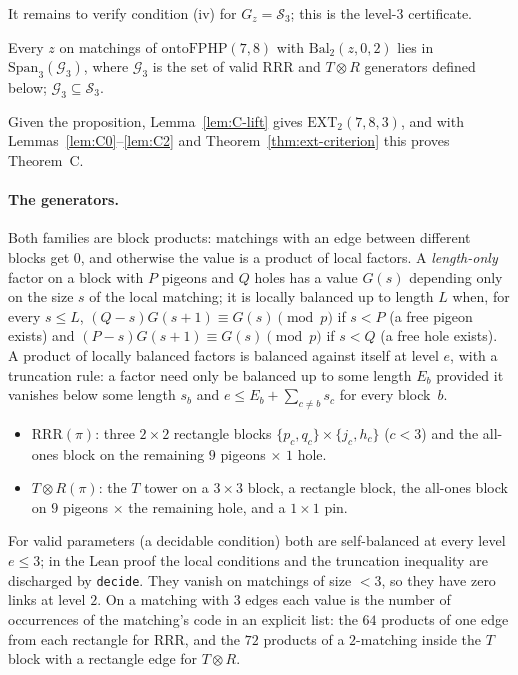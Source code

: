 It remains to verify condition (iv) for $G_z=\mathcal S_3$; this is the level-$3$
certificate.

\begin{proposition}\label{prop:C-z3}
Every $z$ on matchings of $\mathrm{ontoFPHP}(7,8)$ with $\mathrm{Bal}_2(z,0,2)$ lies
in $\mathrm{Span}_3(\mathcal G_3)$, where $\mathcal G_3$ is the set of valid RRR and
$T\otimes R$ generators defined below; $\mathcal G_3\subseteq\mathcal S_3$.
\end{proposition}

Given the proposition, Lemma~\ref{lem:C-lift} gives
$\mathrm{EXT}_2(7,8,3)$, and with
Lemmas~\ref{lem:C0}--\ref{lem:C2} and Theorem~\ref{thm:ext-criterion} this proves
Theorem~C.

\paragraph{The generators.}
Both families are block products: matchings with an edge between different blocks
get $0$, and otherwise the value is a product of local factors.  A \emph{length-only}
factor on a block with $P$ pigeons and $Q$ holes has a value $G(s)$ depending only
on the size $s$ of the local matching; it is locally balanced up to length $L$ when, for
every $s\le L$, $(Q-s)G(s+1)\equiv G(s)\pmod p$ if $s<P$ (a free pigeon exists) and
$(P-s)G(s+1)\equiv G(s)\pmod p$ if $s<Q$ (a free hole exists).  A
product of locally balanced factors is balanced against itself at level $e$, with a
truncation rule: a factor need only be balanced up to some length $E_b$ provided it
vanishes below some length $s_b$ and $e\le E_b+\sum_{c\ne b}s_c$ for every
block~$b$.
\begin{itemize}
\item $\mathrm{RRR}(\pi)$: three $2\times2$ rectangle blocks
$\{p_c,q_c\}\times\{j_c,h_c\}$ ($c<3$) and the all-ones block on the remaining $9$
pigeons $\times$ $1$ hole.
\item $T\otimes R(\pi)$: the $T$ tower on a $3\times3$ block, a rectangle block, the
all-ones block on $9$ pigeons $\times$ the remaining hole, and a $1\times1$ pin.
\end{itemize}
For valid parameters (a decidable condition) both are self-balanced at every level
$e\le3$; in the Lean proof the local conditions and the truncation inequality are
discharged by \texttt{decide}.  They vanish on
matchings of size $<3$, so they have zero links at level $2$.
On a matching with $3$ edges each value is the number of occurrences of the
matching's code in an explicit list: the $64$ products of one edge from each
rectangle for RRR, and the $72$ products of a $2$-matching inside the $T$ block with a
rectangle edge for $T\otimes R$.

